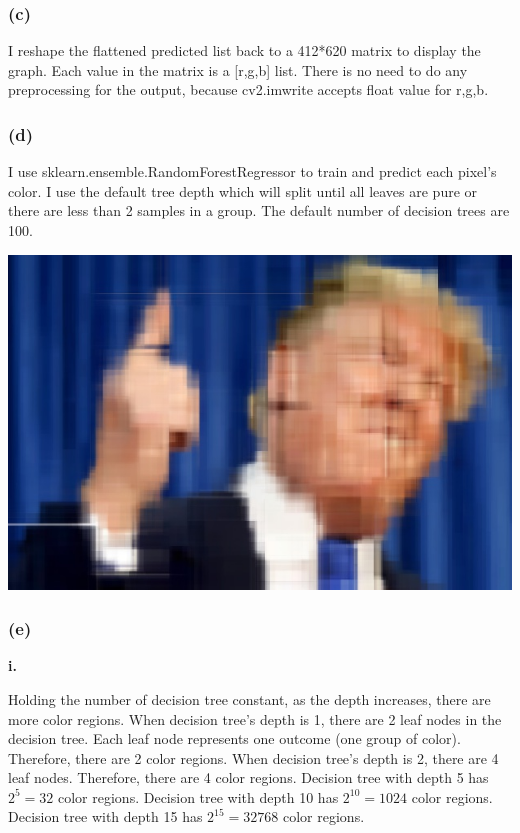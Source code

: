 \documentclass[12pt]{article}
\begin{document}
{\subsubsection*{(c)}
I reshape the flattened predicted list back to a 412*620 matrix to display the graph. Each value in the matrix is a [r,g,b] list. There is no need to do any preprocessing for the output, because cv2.imwrite accepts float value for r,g,b.

\subsubsection*{(d)}
I use sklearn.ensemble.RandomForestRegressor to train and predict each pixel's color. I use the default tree depth which will split until all leaves are pure or there are less than 2 samples in a group. The default number of decision trees are 100.

\medskip
\includegraphics[scale=0.2]{P1/RF_Trump.jpg}

\subsubsection*{(e)}
\textbf{i.}

Holding the number of decision tree constant, as the depth increases, there are more color regions. When decision tree's depth is 1, there are 2 leaf nodes in the decision tree. Each leaf node represents one outcome (one group of color). Therefore, there are 2 color regions. When decision tree's depth is 2, there are 4 leaf nodes. Therefore, there are 4 color regions. Decision tree with depth 5 has $2^5=32$ color regions. Decision tree with depth 10 has $2^{10}=1024$ color regions. Decision tree with depth 15 has $2^{15}=32768$ color regions.

}
\end{document}
